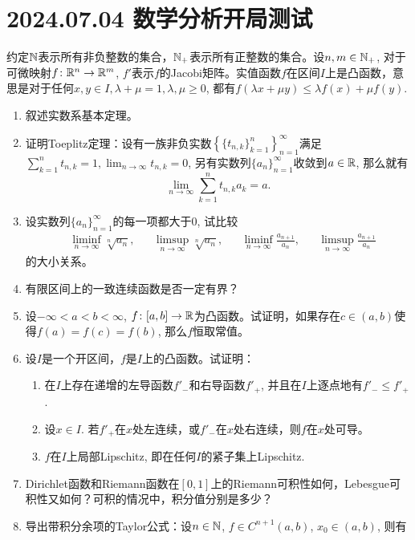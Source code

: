 \section*{2024.07.04 数学分析开局测试}
约定$\mathbb{N}$表示所有非负整数的集合，$\mathbb{N_+}$表示所有正整数的集合。设$n,m\in\mathbb{N_+}$, 对于可微映射$f\colon \mathbb{R}^n\to\mathbb{R}^m$, $f'$表示$f$的Jacobi矩阵。实值函数$f$在区间$I$上是凸函数，意思是对于任何$x,y\in I,\lambda+\mu=1,\lambda,\mu\geqslant 0$, 都有$f(\lambda x+\mu y)\leqslant \lambda f(x)+\mu f(y)$.
\begin{enumerate}
    \item 叙述实数系基本定理。
    \item 证明Toeplitz定理：设有一族非负实数$\left\{\{t_{n,k}\}_{k=1}^n\right\}_{n=1}^\infty$满足$\sum_{k=1}^{n}t_{n,k}=1,\lim_{n\to\infty}t_{n,k}=0$, 另有实数列$\{a_n\}_{n=1}^\infty$收敛到$a\in \mathbb{R}$, 那么就有\begin{equation*}
        \lim_{n\to \infty}\sum_{k=1}^{n}t_{n,k}a_k=a.
    \end{equation*}
    \item 设实数列$\{a_n\}_{n=1}^{\infty}$的每一项都大于0, 试比较\begin{align*}
        &\liminf_{n\to\infty}\sqrt[n]{a_n},&&\limsup_{n\to\infty}\sqrt[n]{a_n},&&\liminf_{n\to\infty}\frac{a_{n+1}}{a_n},&&\limsup_{n\to\infty}\frac{a_{n+1}}{a_n}
    \end{align*}的大小关系。
    \item 有限区间上的一致连续函数是否一定有界？
    \item 设$-\infty<a<b<\infty$, $f\colon [a,b]\to\mathbb{R}$为凸函数。试证明，如果存在$c\in(a,b)$使得$f(a)=f(c)=f(b)$, 那么$f$恒取常值。
    \item 设$I$是一个开区间，$f$是$I$上的凸函数。试证明：
    \begin{enumerate}
        \item 在$I$上存在递增的左导函数$f'_-$和右导函数$f'_+$, 并且在$I$上逐点地有$f'_-\leqslant f'_+$.
        \item 设$x\in I$. 若$f'_+$在$x$处左连续，或$f'_-$在$x$处右连续，则$f$在$x$处可导。
        \item $f$在$I$上局部Lipschitz, 即在任何$I$的紧子集上Lipschitz.
    \end{enumerate}
    \item Dirichlet函数和Riemann函数在$[0,1]$上的Riemann可积性如何，Lebesgue可积性又如何？可积的情况中，积分值分别是多少？
    \item 导出带积分余项的Taylor公式：设$n\in\mathbb{N}$, $f\in C^{n+1}(a,b)$, $x_0\in (a,b)$, 则有\begin{equation*}

\end{equation*}
\end{enumerate}
